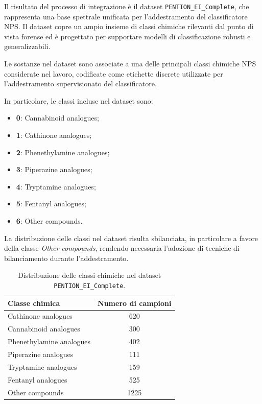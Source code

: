 Il risultato del processo di integrazione è il dataset \texttt{PENTION\_EI\_Complete}, che rappresenta una base spettrale unificata per l’addestramento del classificatore NPS.
Il dataset copre un ampio insieme di classi chimiche rilevanti dal punto di vista forense ed è progettato per supportare modelli di classificazione robusti e generalizzabili.

Le sostanze nel dataset sono associate a una delle principali classi chimiche NPS considerate nel lavoro, codificate come etichette discrete utilizzate per l’addestramento supervisionato del classificatore.

In particolare, le classi incluse nel dataset sono:
\begin{itemize}
	\item \textbf{0}: Cannabinoid analogues;
	\item \textbf{1}: Cathinone analogues;
	\item \textbf{2}: Phenethylamine analogues;
	\item \textbf{3}: Piperazine analogues;
	\item \textbf{4}: Tryptamine analogues;
	\item \textbf{5}: Fentanyl analogues;
	\item \textbf{6}: Other compounds.
\end{itemize}

La distribuzione delle classi nel dataset risulta sbilanciata, in particolare a favore della classe \emph{Other compounds}, rendendo necessaria l’adozione di tecniche di bilanciamento durante l’addestramento.

\begin{table}[H]
	\centering
	\small
	\begin{tabular}{lc}
		\toprule
		\textbf{Classe chimica}  & \textbf{Numero di campioni} \\
		\midrule
		Cathinone analogues      & 620                         \\
		Cannabinoid analogues    & 300                         \\
		Phenethylamine analogues & 402                         \\
		Piperazine analogues     & 111                         \\
		Tryptamine analogues     & 159                         \\
		Fentanyl analogues       & 525                         \\
		Other compounds          & 1225                        \\
		\bottomrule
	\end{tabular}
	\caption{Distribuzione delle classi chimiche nel dataset \texttt{PENTION\_EI\_Complete}.}
	\label{tab:dataset_class_distribution}
\end{table}


